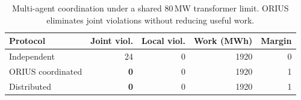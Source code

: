 \begin{table}[htbp]
\centering
\small
\caption{Multi-agent coordination under a shared 80\,MW transformer limit. ORIUS eliminates joint violations without reducing useful work.}
\label{tab:multi_agent}
\begin{tabular}{@{}lrrrr@{}}
\toprule
Protocol & Joint viol. & Local viol. & Work (MWh) & Margin \\
\midrule
Independent & 24 & 0 & 1920 & 0 \\
ORIUS coordinated & \textbf{0} & 0 & 1920 & 1 \\
Distributed & \textbf{0} & 0 & 1920 & 1 \\
\bottomrule
\end{tabular}
\end{table}